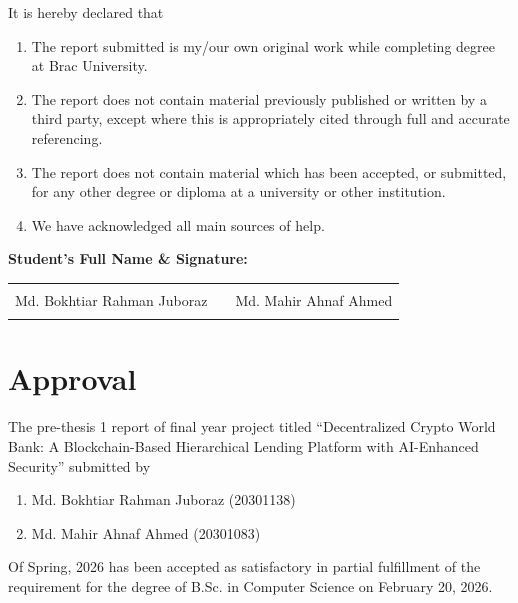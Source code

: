 \documentclass[11pt,a4paper]{article}
\begin{document}
It is hereby declared that

\begin{enumerate}
\item The report submitted is my/our own original work while completing degree at Brac University.

\item The report does not contain material previously published or written by a third party, except where this is appropriately cited through full and accurate referencing.

\item The report does not contain material which has been accepted, or submitted, for any other degree or diploma at a university or other institution.

\item We have acknowledged all main sources of help.
\end{enumerate}

\vspace{2cm}

\textbf{Student's Full Name \& Signature:}

\vspace{2cm}

\begin{tabular}{p{6cm}p{1cm}p{6cm}}
\hrulefill & & \hrulefill \\
\centering Md. Bokhtiar Rahman Juboraz & & \centering Md. Mahir Ahnaf Ahmed \tabularnewline
\centering 20301138 & & \centering 20301083 \tabularnewline
\end{tabular}

\newpage

\thispagestyle{empty}

\section*{Approval}

The pre-thesis 1 report of final year project titled ``Decentralized Crypto World Bank: A Blockchain-Based Hierarchical Lending Platform with AI-Enhanced Security'' submitted by

\begin{enumerate}
\item Md. Bokhtiar Rahman Juboraz (20301138)
\item Md. Mahir Ahnaf Ahmed (20301083)
\end{enumerate}

Of Spring, 2026 has been accepted as satisfactory in partial fulfillment of the requirement for the degree of B.Sc. in Computer Science on February 20, 2026.
\end{document}
